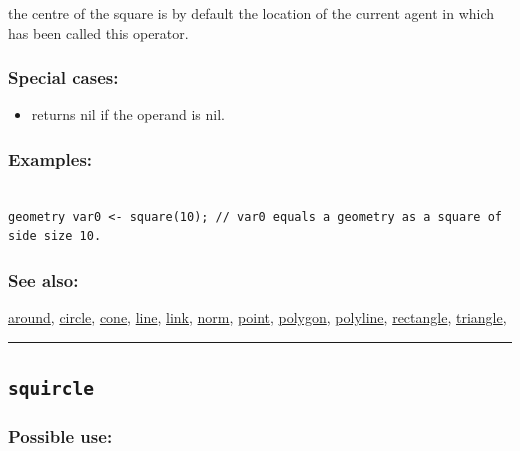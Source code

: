 \documentclass[]{book}
\providecommand{\tightlist}{%
  \setlength{\itemsep}{0pt}\setlength{\parskip}{0pt}}
\theoremstyle{definition}
\theoremstyle{definition}
\theoremstyle{definition}
\theoremstyle{remark}
\begin{document}
the centre of the square is by default the location of the current agent
in which has been called this operator.

\subsubsection{Special cases:}\label{special-cases-130}

\begin{itemize}
\tightlist
\item
  returns nil if the operand is nil.
\end{itemize}

\subsubsection{Examples:}\label{examples-348}

\begin{verbatim}
 
geometry var0 <- square(10); // var0 equals a geometry as a square of side size 10.
\end{verbatim}

\subsubsection{See also:}\label{see-also-195}

\href{operators-a-to-a.html\#around}{around},
\href{operators-b-to-c.html\#circle}{circle},
\href{operators-b-to-c.html\#cone}{cone},
\href{operators-i-to-m.html\#line}{line},
\href{operators-i-to-m.html\#link}{link},
\href{operators-n-to-r.html\#norm}{norm},
\href{operators-n-to-r.html\#point}{point},
\href{operators-n-to-r.html\#polygon}{polygon},
\href{operators-n-to-r.html\#polyline}{polyline},
\href{operators-n-to-r.html\#rectangle}{rectangle},
\href{operators-s-to-z.html\#triangle}{triangle},

\begin{center}\rule{0.5\linewidth}{\linethickness}\end{center}

\subsection{\texorpdfstring{\texttt{squircle}}{squircle}}\label{squircle}

\subsubsection{Possible use:}\label{possible-use-500}
\end{document}
